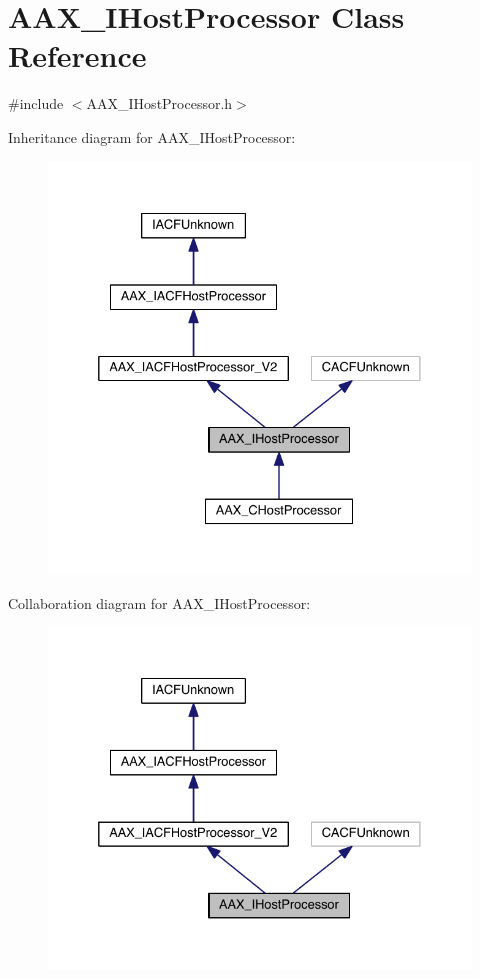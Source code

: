 \hypertarget{a00101}{}\section{A\+A\+X\+\_\+\+I\+Host\+Processor Class Reference}
\label{a00101}


{\ttfamily \#include $<$A\+A\+X\+\_\+\+I\+Host\+Processor.\+h$>$}



Inheritance diagram for A\+A\+X\+\_\+\+I\+Host\+Processor\+:
\nopagebreak
\begin{figure}[H]
\begin{center}
\leavevmode
\includegraphics[width=332pt]{a00635}
\end{center}
\end{figure}


Collaboration diagram for A\+A\+X\+\_\+\+I\+Host\+Processor\+:
\nopagebreak
\begin{figure}[H]
\begin{center}
\leavevmode
\includegraphics[width=332pt]{a00636}
\end{center}
\end{figure}



